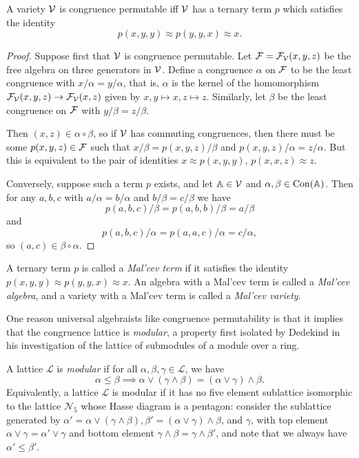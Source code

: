 \documentclass[letterpaper,11pt]{article}
\DeclareMathOperator{\Con}{Con}
\begin{document}
\begin{thm} A variety $\mathcal{V}$ is congruence permutable iff $\mathcal{V}$ has a ternary term $p$ which satisfies the identity
\[
p(x,y,y) \approx p(y,y,x) \approx x.
\]
\end{thm}
\begin{proof} Suppose first that $\mathcal{V}$ is congruence permutable. Let $\mathcal{F} = \mathcal{F}_{\mathcal{V}}(x,y,z)$ be the free algebra on three generators in $\mathcal{V}$. Define a congruence $\alpha$ on $\mathcal{F}$ to be the least congruence with $x/\alpha = y/\alpha$, that is, $\alpha$ is the kernel of the homomorphism $\mathcal{F}_{\mathcal{V}}(x,y,z) \rightarrow \mathcal{F}_{\mathcal{V}}(x,z)$ given by $x,y \mapsto x, z \mapsto z$. Similarly, let $\beta$ be the least congruence on $\mathcal{F}$ with $y/\beta = z/\beta$.

Then $(x,z) \in \alpha \circ \beta$, so if $\mathcal{V}$ has commuting congruences, then there must be some $p(x,y,z) \in \mathcal{F}$ such that $x/\beta = p(x,y,z)/\beta$ and $p(x,y,z)/\alpha = z/\alpha$. But this is equivalent to the pair of identities $x \approx p(x,y,y)$, $p(x,x,z) \approx z$.

Conversely, suppose such a term $p$ exists, and let $\mathbb{A} \in \mathcal{V}$ and $\alpha, \beta \in \Con(\bA)$. Then for any $a,b,c$ with $a/\alpha = b/\alpha$ and $b/\beta = c/\beta$ we have
\[
p(a,b,c)/\beta = p(a,b,b)/\beta = a/\beta
\]
and
\[
p(a,b,c)/\alpha = p(a,a,c)/\alpha = c/\alpha,
\]
so $(a,c) \in \beta\circ\alpha$.
\end{proof}

\begin{defn} A ternary term $p$ is called a \emph{Mal'cev term} if it satisfies the identity $p(x,y,y) \approx p(y,y,x) \approx x$. An algebra with a Mal'cev term is called a \emph{Mal'cev algebra}, and a variety with a Mal'cev term is called a \emph{Mal'cev variety}.
\end{defn}

One reason universal algebraists like congruence permutability is that it implies that the congruence lattice is \emph{modular}, a property first isolated by Dedekind in his investigation of the lattice of submodules of a module over a ring.

\begin{defn}\label{modular-defn} A lattice $\mathcal{L}$ is \emph{modular} if for all $\alpha, \beta, \gamma \in \mathcal{L}$, we have
\[
\alpha \le \beta \implies \alpha \vee (\gamma \wedge \beta) = (\alpha \vee \gamma) \wedge \beta.
\]
Equivalently, a lattice $\mathcal{L}$ is modular if it has no five element sublattice isomorphic to the lattice $\mathcal{N}_5$ whose Hasse diagram is a pentagon: consider the sublattice generated by $\alpha' = \alpha \vee (\gamma \wedge \beta), \beta' = (\alpha \vee \gamma) \wedge \beta$, and $\gamma$, with top element $\alpha \vee \gamma = \alpha' \vee \gamma$ and bottom element $\gamma \wedge \beta = \gamma \wedge \beta'$, and note that we always have $\alpha' \le \beta'$.
\end{defn}
\end{document}
